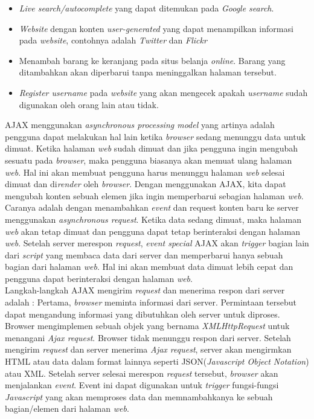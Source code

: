 \begin{itemize}
	\item \textit{Live search/autocomplete} yang dapat ditemukan pada \textit{Google search}.
	\item \textit{Website} dengan konten \textit{user-generated} yang dapat menampilkan informasi pada \textit{website}, contohnya adalah \textit{Twitter} dan \textit{Flickr}
	\item Menambah barang ke keranjang pada situs belanja \textit{online}. Barang yang ditambahkan akan diperbarui tanpa meninggalkan halaman tersebut.
	\item \textit{Register username} pada \textit{website} yang akan mengecek apakah \textit{username} sudah digunakan oleh orang lain atau tidak.
\end{itemize}

AJAX menggunakan \textit{asynchronous processing model} yang artinya adalah pengguna dapat melakukan hal lain ketika \textit{browser} sedang menunggu data untuk dimuat. Ketika halaman \textit{web} sudah dimuat dan jika pengguna ingin mengubah sesuatu pada \textit{browser}, maka pengguna biasanya akan memuat ulang halaman \textit{web}. Hal ini akan membuat pengguna harus menunggu halaman \textit{web} selesai dimuat dan di\textit{render} oleh \textit{browser}. Dengan menggunakan AJAX, kita dapat mengubah konten sebuah elemen jika ingin memperbarui sebagian halaman \textit{web}. Caranya adalah dengan menambahkan \textit{event} dan request konten baru ke server menggunakan \textit{asynchronous request}. Ketika data sedang dimuat, maka halaman \textit{web} akan tetap dimuat dan pengguna dapat tetap berinteraksi dengan halaman \textit{web}. Setelah server merespon \textit{request}, \textit{event special} AJAX akan \textit{trigger} bagian lain dari \textit{script} yang membaca data dari server dan memperbarui hanya sebuah bagian dari halaman \textit{web}. Hal ini akan membuat data dimuat lebih cepat dan pengguna dapat berinteraksi dengan halaman \textit{web}.\\

Langkah-langkah AJAX mengirim \textit{request} dan menerima respon dari server adalah : Pertama, \textit{browser} meminta informasi dari server. Permintaan tersebut dapat mengandung informasi yang dibutuhkan oleh server untuk diproses. Browser mengimplemen sebuah objek yang bernama \textit{XMLHttpRequest} untuk menangani \textit{Ajax request}. Browser tidak menunggu respon dari server. Setelah mengirim \textit{request} dan server menerima \textit{Ajax request}, server akan mengirmkan HTML atau data dalam format lainnya seperti JSON(\textit{Javascript Object Notation}) atau XML. Setelah server selesai merespon \textit{request} tersebut, \textit{browser} akan menjalankan \textit{event}. Event ini dapat digunakan untuk \textit{trigger} fungsi-fungsi \textit{Javascript} yang akan memproses data dan memnambahkanya ke sebuah bagian/elemen dari halaman \textit{web}.

